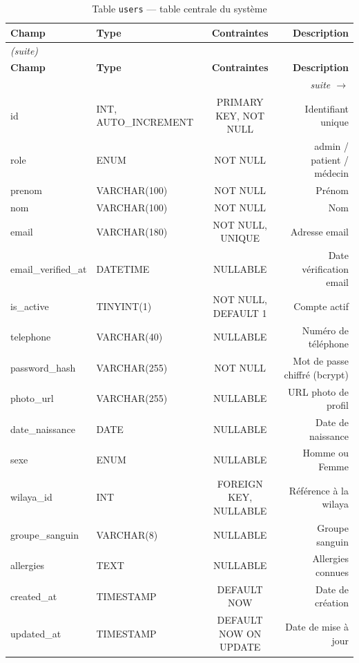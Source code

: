 \documentclass[12pt,a4paper]{report}
\newcommand{\longtblheader}{%
  \hline
  \textbf{Champ} & \textbf{Type} & \textbf{Contraintes} & \textbf{Description} \\
  \hline\hline
  \endfirsthead
  \multicolumn{4}{l}{\small\textit{(suite)}} \\
  \hline
  \textbf{Champ} & \textbf{Type} & \textbf{Contraintes} & \textbf{Description} \\
  \hline\hline
  \endhead
  \hline
  \multicolumn{4}{r|}{\small\textit{suite $\rightarrow$}} \\
  \endfoot
  \hline
  \endlastfoot
}
\begin{document}
\begin{longtable}{ABCD}
  \caption{Table \texttt{users} --- table centrale du syst\`eme} \label{tab:users} \\
  \longtblheader
  id                  & INT, AUTO\_INCREMENT & PRIMARY KEY, NOT NULL  & Identifiant unique \\ \hline
  role                & ENUM                & NOT NULL                & admin / patient / m\'edecin \\ \hline
  prenom              & VARCHAR(100)        & NOT NULL                & Pr\'enom \\ \hline
  nom                 & VARCHAR(100)        & NOT NULL                & Nom \\ \hline
  email               & VARCHAR(180)        & NOT NULL, UNIQUE         & Adresse email \\ \hline
  email\_verified\_at & DATETIME            & NULLABLE                & Date v\'erification email \\ \hline
  is\_active          & TINYINT(1)          & NOT NULL, DEFAULT 1     & Compte actif \\ \hline
  telephone           & VARCHAR(40)         & NULLABLE                & Num\'ero de t\'el\'ephone \\ \hline
  password\_hash      & VARCHAR(255)        & NOT NULL                & Mot de passe chiffr\'e (bcrypt) \\ \hline
  photo\_url          & VARCHAR(255)        & NULLABLE                & URL photo de profil \\ \hline
  date\_naissance     & DATE                & NULLABLE                & Date de naissance \\ \hline
  sexe                & ENUM                & NULLABLE                & Homme ou Femme \\ \hline
  wilaya\_id          & INT                 & FOREIGN KEY, NULLABLE   & R\'ef\'erence \`a la wilaya \\ \hline
  groupe\_sanguin     & VARCHAR(8)          & NULLABLE                & Groupe sanguin \\ \hline
  allergies           & TEXT                & NULLABLE                & Allergies connues \\ \hline
  created\_at         & TIMESTAMP           & DEFAULT NOW             & Date de cr\'eation \\ \hline
  updated\_at         & TIMESTAMP           & DEFAULT NOW ON UPDATE   & Date de mise \`a jour \\ \hline
\end{longtable}
\end{document}

